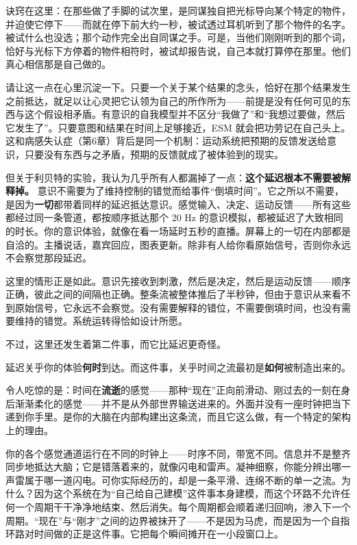 \documentclass[11pt, twoside, openright]{book}
\begin{document}
诀窍在这里：在那些做了手脚的试次里，是同谋独自把光标导向某个特定的物件，并迫使它停下------而就在停下前大约一秒，被试透过耳机听到了那个物件的名字。被试什么也没选；那个动作完全出自同谋之手。可是，当他们刚刚听到的那个词，恰好与光标下方停着的物件相符时，被试却报告说，自己本就打算停在那里。他们真心相信那是自己做的。

请让这一点在心里沉淀一下。只要一个关于某个结果的念头，恰好在那个结果发生之前抵达，就足以让心灵把它认领为自己的所作所为------前提是没有任何可见的东西与这个假设相矛盾。有意识的自我模型并不区分“我做了”和“我想过要做，然后它发生了”。只要意图和结果在时间上足够接近，ESM 就会把功劳记在自己头上。这和病感失认症（第6章）背后是同一个机制：运动系统把预期的反馈发送给意识，只要没有东西与之矛盾，预期的反馈就成了被体验到的现实。

但关于利贝特的实验，我认为几乎所有人都漏掉了一点：\textbf{这个延迟根本不需要被解释掉。} 意识不需要为了维持控制的错觉而给事件“倒填时间”。它之所以不需要，是因为\textbf{一切}都带着同样的延迟抵达意识。感觉输入、决定、运动反馈------所有这些都经过同一条管道，都按顺序抵达那个 20 Hz 的意识模拟，都被延迟了大致相同的时长。你的意识体验，就像在看一场延时五秒的直播。屏幕上的一切在内部都是自洽的。主播说话，嘉宾回应，图表更新。除非有人给你看原始信号，否则你永远不会察觉那段延迟。

这里的情形正是如此。意识先接收到刺激，然后是决定，然后是运动反馈------顺序正确，彼此之间的间隔也正确。整条流被整体推后了半秒钟，但由于意识从来看不到原始信号，它永远不会察觉。没有需要解释的错位，不需要倒填时间，也没有需要维持的错觉。系统运转得恰如设计所愿。

不过，这里还发生着第二件事，而它比延迟更奇怪。

延迟关乎你的体验\textbf{何时}到达。而这件事，关乎时间之流最初是\textbf{如何}被制造出来的。

令人吃惊的是：时间在\textbf{流逝}的感觉------那种“现在”正向前滑动、刚过去的一刻在身后渐渐柔化的感觉------并不是从外部世界输送进来的。外面并没有一座时钟把当下递到你手里。是你的大脑在内部构建出这条流，而且它这么做，有一个特定的架构上的理由。

你的各个感觉通道运行在不同的时钟上------时序不同，带宽不同。信息并不是整齐同步地抵达大脑；它是错落着来的，就像闪电和雷声。凝神细察，你能分辨出哪一声雷属于哪一道闪电。可你实际经历的，却是一条平滑、连绵不断的单一之流。为什么？因为这个系统在为“自己给自己建模”这件事本身建模，而这个环路不允许任何一个周期干干净净地结束、然后消失。每个周期都会顺着递归回响，渗入下一个周期。“现在”与“刚才”之间的边界被抹开了------不是因为马虎，而是因为一个自指环路对时间做的正是这件事。它把每个瞬间摊开在一小段窗口上。
\end{document}
